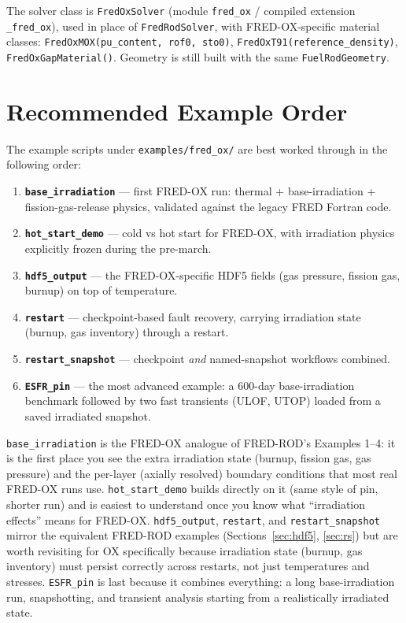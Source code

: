 \documentclass[11pt,a4paper]{article}
\begin{document}
The solver class is \texttt{FredOxSolver} (module \texttt{fred\_ox} /
compiled extension \texttt{\_fred\_ox}), used in place of
\texttt{FredRodSolver}, with FRED-OX-specific material classes:
\texttt{FredOxMOX(pu\_content, rof0, sto0)}, \texttt{FredOxT91(reference\_density)},
\texttt{FredOxGapMaterial()}.  Geometry is still built with the same
\texttt{FuelRodGeometry}.

\section{Recommended Example Order}
\label{sec:ox-order}

The example scripts under \texttt{examples/fred\_ox/} are best worked
through in the following order:

\begin{enumerate}
  \item \textbf{\texttt{base\_irradiation}} --- first FRED-OX run: thermal +
        base-irradiation + fission-gas-release physics, validated against
        the legacy FRED Fortran code.
  \item \textbf{\texttt{hot\_start\_demo}} --- cold vs hot start for FRED-OX,
        with irradiation physics explicitly frozen during the pre-march.
  \item \textbf{\texttt{hdf5\_output}} --- the FRED-OX-specific HDF5 fields
        (gas pressure, fission gas, burnup) on top of temperature.
  \item \textbf{\texttt{restart}} --- checkpoint-based fault recovery,
        carrying irradiation state (burnup, gas inventory) through a restart.
  \item \textbf{\texttt{restart\_snapshot}} --- checkpoint \emph{and}
        named-snapshot workflows combined.
  \item \textbf{\texttt{ESFR\_pin}} --- the most advanced example: a 600-day
        base-irradiation benchmark followed by two fast transients (ULOF,
        UTOP) loaded from a saved irradiated snapshot.
\end{enumerate}

\begin{infobox}
  \texttt{base\_irradiation} is the FRED-OX analogue of FRED-ROD's Examples
  1--4: it is the first place you see the extra irradiation state (burnup,
  fission gas, gas pressure) and the per-layer (axially resolved) boundary
  conditions that most real FRED-OX runs use.  \texttt{hot\_start\_demo}
  builds directly on it (same style of pin, shorter run) and is easiest to
  understand once you know what ``irradiation effects'' means for FRED-OX.
  \texttt{hdf5\_output}, \texttt{restart}, and \texttt{restart\_snapshot}
  mirror the equivalent FRED-ROD examples (Sections~\ref{sec:hdf5},
  \ref{sec:rs}) but are worth revisiting for OX specifically because
  irradiation state (burnup, gas inventory) must persist correctly across
  restarts, not just temperatures and stresses.  \texttt{ESFR\_pin} is last
  because it combines everything: a long base-irradiation run, snapshotting,
  and transient analysis starting from a realistically irradiated state.
\end{infobox}
\end{document}
